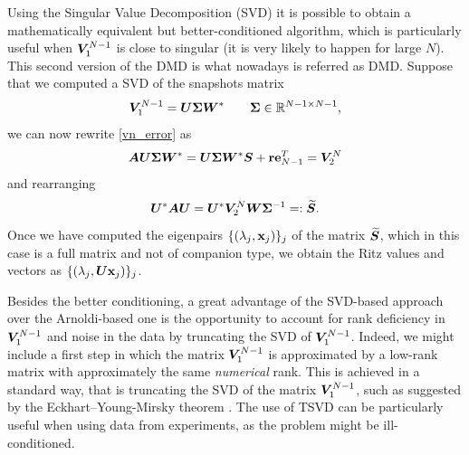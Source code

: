 Using the Singular Value Decomposition (SVD) it is possible to obtain a mathematically equivalent but better-conditioned algorithm, which is particularly useful when $\vb*{V}_1^{N-1}$ is close to singular (it is very likely to happen for large $N$). This second version of the DMD is what nowadays is referred as DMD. Suppose that we computed a SVD of the snapshots matrix
\begin{equation*}
    \vb*{V}_1^{N-1} = \vb*{U}\vb*{\Sigma}\vb*{W}^* \qquad \vb*{\Sigma}\in\mathbb{R}^{N-1\times N-1},
\end{equation*}
we can now rewrite \eqref{vn_error} as
\begin{equation}
    \label{vn_error_rewritten}
    \vb*{A}\vb*{U}\vb*{\Sigma}\vb*{W}^* = \vb*{U}\vb*{\Sigma}\vb*{W}^*\vb*{S} + \vb{r}\vb{e}_{N-1}^T = \vb*{V}_2^N
\end{equation}
and rearranging
\begin{equation}
    \label{S_tilde_definition}
    \vb*{U}^*\vb*{A}\vb*{U} = \vb*{U}^*\vb*{V}_2^N\vb*{W}\vb*{\Sigma}^{-1} =: \widetilde{\vb*{S}}.
\end{equation}
Once we have computed the eigenpairs $\{(\lambda_j, \vb{x}_j)\}_j$ of the matrix $\widetilde{\vb*{S}}$, which in this case is a full matrix and not of companion type, we obtain the Ritz values and vectors as $\{(\lambda_j, \vb*{U}\vb{x}_j)\}_j$. 

Besides the better conditioning, a great advantage of the SVD-based approach over the Arnoldi-based one is the opportunity to account for rank deficiency in $\vb*{V}_1^{N-1}$ and noise in the data by truncating the SVD of $\vb*{V}_1^{N-1}$. Indeed, we might include a first step in which the matrix $\vb*{V}_1^{N-1}$ is approximated by a low-rank matrix with approximately the same \emph{numerical} rank. This is achieved in a standard way, that is truncating the SVD of the matrix $\vb*{V}_1^{N-1}$, such as suggested by the Eckhart–Young-Mirsky theorem \cite{golub_matrix_2013}. The use of TSVD can be particularly useful when using data from experiments, as the problem might be ill-conditioned. 


